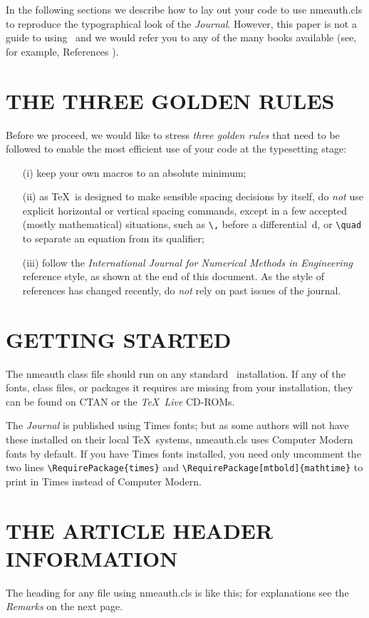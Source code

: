 \documentclass{nmeauth}
\begin{document}
In the following sections we describe how to lay out your code to use
\textsf{nmeauth.cls} to reproduce the typographical look of the \emph{Journal}.
However, this paper is not a guide to using \LaTeXe\ and we would refer you
to any of the many books available
(see, for example, References \cite{Companion,KopkaDaly,Lamport}).

\section{THE THREE GOLDEN RULES}
Before we proceed, we would like to stress \emph{three golden rules}
that need to be followed to enable the most efficient use of your code
at the typesetting stage:
\begin{enumerate}
\item[(i)]
keep your own macros to an absolute minimum;
\item[(ii)]
as \TeX\ is designed to make sensible spacing decisions by itself,
do \emph{not} use explicit horizontal or vertical spacing commands,
except in a few accepted (mostly mathematical) situations, such as
\verb"\," before a differential~d,
or \verb"\quad" to separate an equation from its qualifier;
\item[(iii)]
follow the \emph{International Journal for Numerical Methods in Engineering} reference style,
as shown at the end of this document. As the style of references has
changed recently, do \emph{not} rely on past issues of the journal.
\end{enumerate}

\section{GETTING STARTED}
The \textsf{nmeauth} class file
should run on any standard \LaTeXe\ installation.
If any of the fonts, class files, or packages it requires
are missing from your installation, they can be found on
CTAN or the \emph{\TeX\ Live} CD-ROMs.

The \emph{Journal} is published using Times fonts; but as some authors
will not have these installed on their local \TeX\ systems,
\textsf{nmeauth.cls} uses Computer Modern fonts by default.
If you have Times fonts installed, you need only uncomment the two lines
\verb"\RequirePackage{times}" and
\verb"\RequirePackage[mtbold]{mathtime}"
to print in Times instead of Computer Modern.

\section{THE ARTICLE HEADER INFORMATION}
The heading for any file using \textsf{nmeauth.cls} is like this;
for explanations see the \textit{Remarks}
on the next page.
\end{document}
